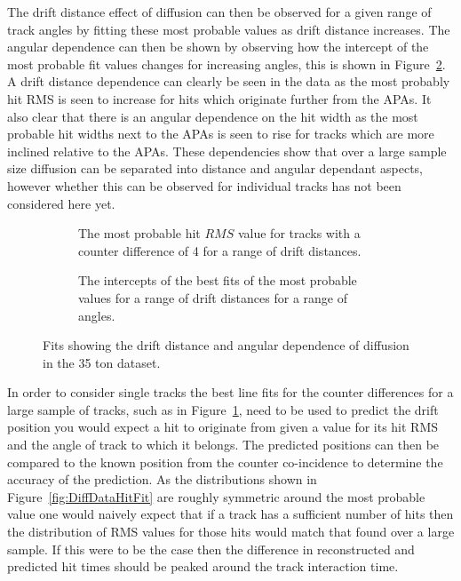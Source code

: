 The drift distance effect of diffusion can then be observed for a given range of track angles by fitting these most probable values as drift distance increases. The angular dependence can then be shown by observing how the intercept of the most probable fit values changes for increasing angles, this is shown in Figure~\ref{fig:DiffDataFit}. A drift distance dependence can clearly be seen in the data as the most probably hit RMS is seen to increase for hits which originate further from the APAs. It also clear that there is an angular dependence on the hit width as the most probable hit widths next to the APAs is seen to rise for tracks which are more inclined relative to the APAs. These dependencies show that over a large sample size diffusion can be separated into distance and angular dependant aspects, however whether this can be observed for individual tracks has not been considered here yet. \\

\begin{figure}[h!]
  \centering
  \begin{subfigure}{0.45\textwidth}
    \centering
    \caption{The most probable hit $RMS$ value for tracks with a counter difference of 4 for a range of drift distances.}
    \label{fig:CDiff4DataFit}
  \end{subfigure}
  \hspace{0.08\textwidth}
  \begin{subfigure}{0.45\textwidth}
    \centering
    \caption{The intercepts of the best fits of the most probable values for a range of drift distances for a range of angles.}
  \end{subfigure}
  \caption[The drift distance and angular dependence of diffusion in the 35 ton data]
          {Fits showing the drift distance and angular dependence of diffusion in the 35 ton dataset.}
          \label{fig:DiffDataFit}
\end{figure}

In order to consider single tracks the best line fits for the counter differences for a large sample of tracks, such as in Figure~\ref{fig:CDiff4DataFit}, need to be used to predict the drift position you would expect a hit to originate from given a value for its hit RMS and the angle of track to which it belongs. The predicted positions can then be compared to the known position from the counter co-incidence to determine the accuracy of the prediction. As the distributions shown in Figure~\ref{fig:DiffDataHitFit} are roughly symmetric around the most probable value one would naively expect that if a track has a sufficient number of hits then the distribution of RMS values for those hits would match that found over a large sample. If this were to be the case then the difference in reconstructed and predicted hit times should be peaked around the track interaction time. \\

